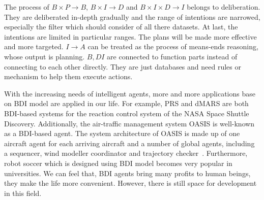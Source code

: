 The process of $B \times P \to B$, $B \times I \to D$ and $B \times I \times D \to I$ belongs to deliberation.
They are deliberated in-depth gradually and the range of intentions are narrowed, especially the filter which should consider of all there datasets.
At last, the intentions are limited in particular ranges.
The plans will be made more effective and more targeted.
$I \to A $ can be treated as the process of means-ends reasoning, whose output is planning.
$B,D I$ are connected to function parts instead of connecting to each other directly.
They are just databases and need rules or mechanism to help them execute actions.

With the increasing needs of intelligent agents, more and more applications base on BDI model are applied in our life.
For example, PRS and dMARS are both BDI-based systems for the reaction control system of the NASA Space Shuttle Discovery.
Additionally, the air-traffic management system OASIS is well-known as a BDI-based agent.
The system architecture of OASIS is made up of one aircraft agent for each arriving aircraft and a number of global agents, including a sequencer, wind modeller coordinator and trajectory checker~\cite{Rao_BDITheory_1995}.
Furthermore, robot soccer which is designed using BDI model becomes very popular in universities.
We can feel that, BDI agents bring many profits to human beings, they make the life more convenient.
However, there is still space for development in this field.

